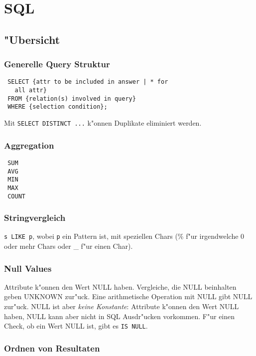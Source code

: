 \documentclass[german, 10pt, a4paper, twocolumn]{scrartcl}
\theoremstyle{definition}
\theoremstyle{remark}
\theoremstyle{example}
\begin{document}
\section{SQL}

\subsection{"Ubersicht}

\subsubsection{Generelle Query Struktur}

\begin{verbatim}
 SELECT {attr to be included in answer | * for 
   all attr}
 FROM {relation(s) involved in query}
 WHERE {selection condition};
\end{verbatim}

Mit \verb#SELECT DISTINCT ...# k"onnen Duplikate eliminiert werden.

\subsubsection{Aggregation}

\begin{verbatim}
 SUM
 AVG
 MIN
 MAX
 COUNT
\end{verbatim}

\subsubsection{Stringvergleich}

\verb#s LIKE p#, wobei \verb#p# ein Pattern ist, mit speziellen Chars (\% f"ur irgendwelche 0 oder mehr Chars oder \_ f"ur einen Char).

\subsubsection{Null Values}

Attribute k"onnen den Wert NULL haben. Vergleiche, die NULL beinhalten geben UNKNOWN zur"uck. Eine arithmetische Operation mit NULL gibt NULL zur"uck. NULL ist aber \textit{keine Konstante}: Attribute k"onnen den Wert NULL haben, NULL kann aber nicht in SQL Ausdr"ucken vorkommen. F"ur einen Check, ob ein Wert NULL ist, gibt es \verb#IS NULL#.


\subsubsection{Ordnen von Resultaten}
\end{document}
